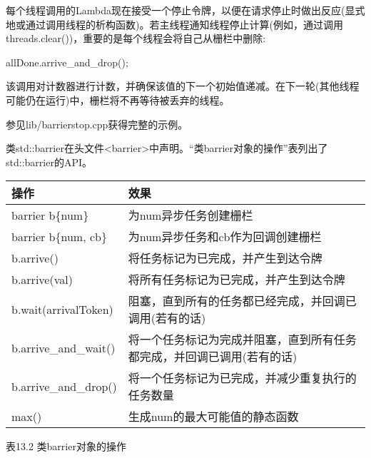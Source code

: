 每个线程调用的Lambda现在接受一个停止令牌，以便在请求停止时做出反应(显式地或通过调用线程的析构函数)。若主线程通知线程停止计算(例如，通过调用threads.clear())，重要的是每个线程会将自己从栅栏中删除:

\begin{cpp}
allDone.arrive_and_drop();
\end{cpp}

该调用对计数器进行计数，并确保该值的下一个初始值递减。在下一轮(其他线程可能仍在运行)中，栅栏将不再等待被丢弃的线程。

参见lib/barrierstop.cpp获得完整的示例。


类std::barrier在头文件<barrier>中声明。“类barrier对象的操作”表列出了std::barrier的API。

\begin{longtable}[c]{|l|l|}
\hline
\textbf{操作} & \textbf{效果}                                                 \\ \hline
\endfirsthead
%
\endhead
%
barrier b\{num\}   & 为num异步任务创建栅栏                    \\ \hline
barrier b\{num, cb\}  & 为num异步任务和cb作为回调创建栅栏                                                \\ \hline
b.arrive()         & 将任务标记为已完成，并产生到达令牌              \\ \hline
b.arrive(val)      & 将所有任务标记为已完成，并产生到达令牌             \\ \hline
b.wait(arrivalToken)  & 阻塞，直到所有的任务都已经完成，并回调已调用(若有的话)                        \\ \hline
b.arrive\_and\_wait() & 将一个任务标记为完成并阻塞，直到所有任务都完成，并回调已调用(若有的话) \\ \hline
b.arrive\_and\_drop() & 将一个任务标记为已完成，并减少重复执行的任务数量                                \\ \hline
max()              & 生成num的最大可能值的静态函数 \\ \hline
\end{longtable}

\begin{center}
表13.2 类barrier对象的操作
\end{center}

